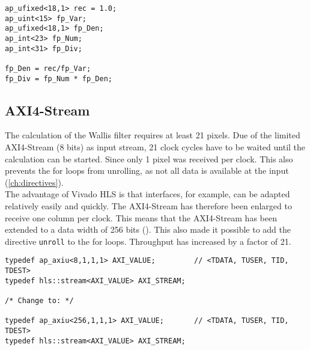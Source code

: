 \begin{minipage}{\textwidth}
\begin{lstlisting}[style=CStyle, caption=Calculation of the division for the Wallis filter, label=lst:division]
ap_ufixed<18,1> rec = 1.0;
ap_uint<15> fp_Var;
ap_ufixed<18,1> fp_Den;
ap_int<23> fp_Num;
ap_int<31> fp_Div;

fp_Den = rec/fp_Var;
fp_Div = fp_Num * fp_Den;
\end{lstlisting}
\end{minipage}


\subsection{AXI4-Stream}
The calculation of the Wallis filter requires at least 21 pixels. Due of the limited AXI4-Stream (8 bits) as input stream, 21 clock cycles have to be waited until the calculation can be started. Since only 1 pixel was received per clock. This also prevents the for loops from unrolling, as not all data is available at the input (\ref{ch:directives}). \\
The advantage of Vivado HLS is that interfaces, for example, can be adapted relatively easily and quickly. The AXI4-Stream has therefore been enlarged to receive one column per clock. This means that the AXI4-Stream has been extended to a data width of 256 bits (\cite{axi_stream}). This also made it possible to add the directive \texttt{unroll} to the for loops. Throughput has increased by a factor of 21.

\begin{minipage}{\textwidth}
\begin{lstlisting}[style=CStyle, caption=Calculation of the division for the Wallis filter, label=lst:division]
typedef ap_axiu<8,1,1,1> AXI_VALUE;			// <TDATA, TUSER, TID, TDEST>
typedef hls::stream<AXI_VALUE> AXI_STREAM;

/* Change to: */

typedef ap_axiu<256,1,1,1> AXI_VALUE;		// <TDATA, TUSER, TID, TDEST>
typedef hls::stream<AXI_VALUE> AXI_STREAM;
\end{lstlisting}
\end{minipage}

